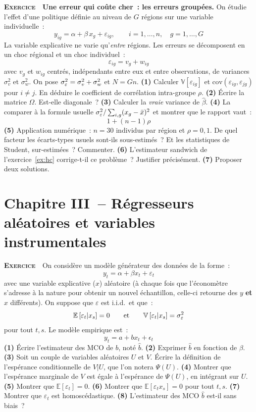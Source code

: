 \documentclass[10pt,a4paper,notitlepage]{article}
\newcounter{xnumber}
\newcommand{\exercice}{\refstepcounter{xnumber}\textsc{\textbf{Exercice}} \textbf{\thexnumber}\,\,}
\newcommand{\question}[1]{\textbf{(#1)}}
\begin{document}
\exercice\label{ex:moulton} \textbf{Une erreur qui coûte cher~: les erreurs
groupées.} On étudie l'effet d'une politique définie au niveau de $G$ régions
sur une variable individuelle~:
\[
  y_{ig} = \alpha + \beta\,x_g + \varepsilon_{ig},
  \qquad i=1,\dots,n,\quad g=1,\dots,G
\]
La variable explicative ne varie qu'\emph{entre} régions. Les erreurs se
décomposent en un choc régional et un choc individuel~:
\[
  \varepsilon_{ig} = v_g + w_{ig}
\]
avec $v_g$ et $w_{ig}$ centrés, indépendants entre eux et entre observations, de
variances $\sigma_v^2$ et $\sigma_w^2$. On pose $\sigma_{\varepsilon}^2 = \sigma_v^2+\sigma_w^2$
et $N = Gn$. \question{1} Calculer $\mathbb V[\varepsilon_{ig}]$ et
$\mathrm{cov}(\varepsilon_{ig},\varepsilon_{jg})$ pour $i\neq j$. En déduire le
coefficient de corrélation intra-groupe $\rho$. \question{2} Écrire la matrice
$\Omega$. Est-elle diagonale~? \question{3} Calculer la \emph{vraie} variance de
$\hat\beta$. \question{4} La comparer à la formule usuelle
$\sigma_{\varepsilon}^2/\sum_{i,g}(x_g-\bar x)^2$ et montrer que le rapport vaut~:
\[
  1+(n-1)\rho
\]
\question{5} Application numérique~: $n=30$ individus par région et
$\rho = 0{,}1$. De quel facteur les écarts-types usuels sont-ils sous-estimés~?
Et les statistiques de Student, sur-estimées~? Commenter. \question{6}
L'estimateur sandwich de l'exercice~\ref{ex:hc} corrige-t-il ce problème~?
Justifier précisément. \question{7} Proposer deux solutions.\newline

\bigskip

\section*{Chapitre III~-- Régresseurs aléatoires et variables instrumentales}

\exercice\label{ex:lie} On considère un modèle générateur des données de la forme~:
\[
y_t = \alpha + \beta x_t + \varepsilon_t
\]
avec une variable explicative ($x$) aléatoire (à chaque fois que
l'économètre s'adresse à la nature pour obtenir un nouvel échantillon,
celle-ci retourne des $y$ \textbf{et} $x$ différents). On suppose
que $\varepsilon$ est i.i.d.\ et que~:
\[
  \mathbb E \left[\varepsilon_t| x_s \right] = 0
  \qquad\text{et}\qquad
  \mathbb V \left[\varepsilon_t| x_s \right] = \sigma_{\varepsilon}^2
\]
pour tout $t,s$. Le modèle empirique est~:
\[
y_t = a + b x_t + \epsilon_t
\]
\question{1} Écrire l'estimateur des MCO de $b$,
noté $\hat{b}$. \question{2} Exprimer $\hat{b}$ en fonction
de $\beta$. \question{3} Soit un couple de variables aléatoires $U$
et $V$. Écrire la définition de l'espérance conditionnelle de $V|U$,
que l'on notera $\Psi(U)$. \question{4} Montrer que l'espérance
marginale de $V$ est égale à l'espérance de $\Psi(U)$, en intégrant
sur $U$. \question{5} Montrer
que $\mathbb E\left[ \varepsilon_t \right]=0$. \question{6} Montrer
que $\mathbb E\left[ \varepsilon_t x_s\right] = 0$ pour
tout $t, s$. \question{7} Montrer que $\varepsilon_t$ est
homoscédastique. \question{8} L'estimateur des MCO $\hat b$ est-il sans
biais~?\newline
\end{document}
